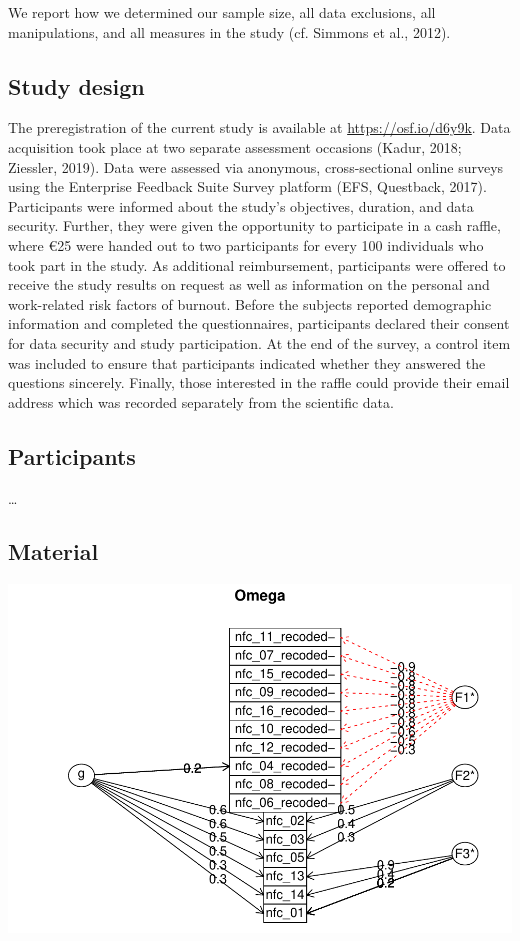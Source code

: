 \documentclass[
  man]{apa6}
\begin{document}
We report how we determined our sample size, all data exclusions, all manipulations, and all measures in the study (cf. Simmons et al., 2012).

\subsection{Study design}\label{study-design}

The preregistration of the current study is available at \url{https://osf.io/d6y9k}.
Data acquisition took place at two separate assessment occasions (Kadur, 2018; Ziessler, 2019).
Data were assessed via anonymous, cross-sectional online surveys using the Enterprise Feedback Suite Survey platform (EFS, Questback, 2017).
Participants were informed about the study's objectives, duration, and data security.
Further, they were given the opportunity to participate in a cash raffle, where €25 were handed out to two participants for every 100 individuals who took part in the study.
As additional reimbursement, participants were offered to receive the study results on request as well as information on the personal and work-related risk factors of burnout.
Before the subjects reported demographic information and completed the questionnaires, participants declared their consent for data security and study participation.
At the end of the survey, a control item was included to ensure that participants indicated whether they answered the questions sincerely.
Finally, those interested in the raffle could provide their email address which was recorded separately from the scientific data.

\subsection{Participants}\label{participants}

\ldots{}

\subsection{Material}\label{material}

\includegraphics{NFC-Caregiver_files/figure-latex/omega-1.pdf}
\end{document}
